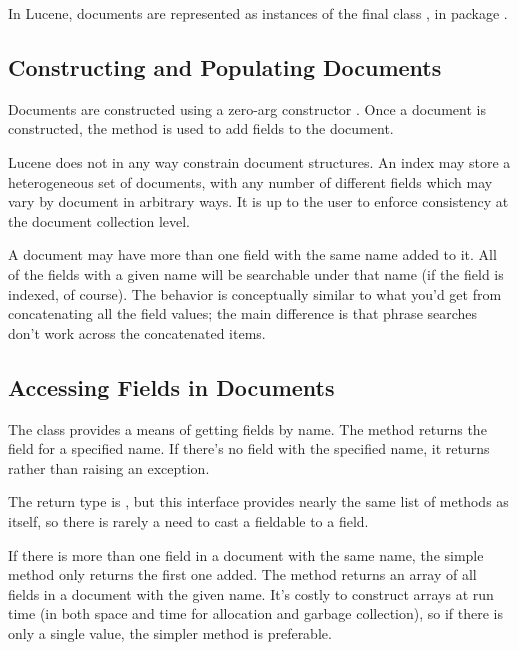 In Lucene, documents are represented as instances of the final class
, in package .

\subsection{Constructing and Populating Documents} 

Documents are constructed using a zero-arg constructor
.  Once a document is constructed, the method
 is used to add fields to the document.

Lucene does not in any way constrain document structures.  An index
may store a heterogeneous set of documents, with any number of
different fields which may vary by document in arbitrary ways.  It is
up to the user to enforce consistency at the document collection
level.  

A document may have more than one field with the same name added to
it.  All of the fields with a given name will be searchable under that
name (if the field is indexed, of course).  The behavior is
conceptually similar to what you'd get from concatenating all the
field values; the main difference is that phrase searches
don't work across the concatenated items.

\subsection{Accessing Fields in Documents}

The  class provides a means of getting fields by name.
The method  returns the field for a
specified name.  If there's no field with the specified name, it
returns  rather than raising an exception.

The return type is , but this interface provides
nearly the same list of methods as  itself, so there is
rarely a need to cast a fieldable to a field.  

If there is more than one field in a document with the same name, the
simple method  only returns the first one
added.  The method  returns an array of
all fields in a document with the given name.  It's costly to
construct arrays at run time (in both space and time for allocation
and garbage collection), so if there is only a single value, the
simpler method is preferable.


